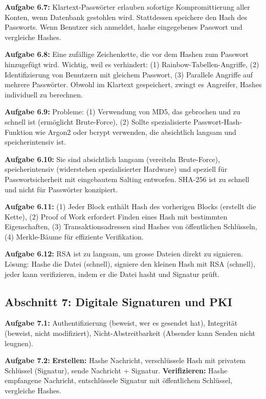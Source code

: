 \documentclass[11pt,a4paper]{report}
\begin{document}
\textbf{Aufgabe 6.7:}
Klartext-Passwörter erlauben sofortige Kompromittierung aller Konten, wenn Datenbank gestohlen wird. Stattdessen speichere den Hash des Passworts. Wenn Benutzer sich anmeldet, hashe eingegebenes Passwort und vergleiche Hashes.

\textbf{Aufgabe 6.8:}
Eine zufällige Zeichenkette, die vor dem Hashen zum Passwort hinzugefügt wird. Wichtig, weil es verhindert: (1) Rainbow-Tabellen-Angriffe, (2) Identifizierung von Benutzern mit gleichem Passwort, (3) Parallele Angriffe auf mehrere Passwörter. Obwohl im Klartext gespeichert, zwingt es Angreifer, Hashes individuell zu berechnen.

\textbf{Aufgabe 6.9:}
Probleme: (1) Verwendung von MD5, das gebrochen und zu schnell ist (ermöglicht Brute-Force), (2) Sollte spezialisierte Passwort-Hash-Funktion wie Argon2 oder bcrypt verwenden, die absichtlich langsam und speicherintensiv ist.

\textbf{Aufgabe 6.10:}
Sie sind absichtlich langsam (vereiteln Brute-Force), speicherintensiv (widerstehen spezialisierter Hardware) und speziell für Passwortsicherheit mit eingebautem Salting entworfen. SHA-256 ist zu schnell und nicht für Passwörter konzipiert.

\textbf{Aufgabe 6.11:}
(1) Jeder Block enthält Hash des vorherigen Blocks (erstellt die Kette), (2) Proof of Work erfordert Finden eines Hash mit bestimmten Eigenschaften, (3) Transaktionsadressen sind Hashes von öffentlichen Schlüsseln, (4) Merkle-Bäume für effiziente Verifikation.

\textbf{Aufgabe 6.12:}
RSA ist zu langsam, um grosse Dateien direkt zu signieren. Lösung: Hashe die Datei (schnell), signiere den kleinen Hash mit RSA (schnell), jeder kann verifizieren, indem er die Datei hasht und Signatur prüft.

\subsection*{Abschnitt 7: Digitale Signaturen und PKI}

\textbf{Aufgabe 7.1:}
Authentifizierung (beweist, wer es gesendet hat), Integrität (beweist, nicht modifiziert), Nicht-Abstreitbarkeit (Absender kann Senden nicht leugnen).

\textbf{Aufgabe 7.2:}
\textbf{Erstellen:} Hashe Nachricht, verschlüssele Hash mit privatem Schlüssel (Signatur), sende Nachricht + Signatur. \textbf{Verifizieren:} Hashe empfangene Nachricht, entschlüssele Signatur mit öffentlichem Schlüssel, vergleiche Hashes.
\end{document}
